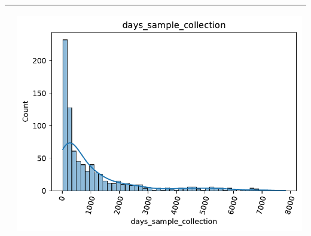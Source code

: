\begin{table}[!htb]
\begin{threeparttable}
\begin{tabular}{p{8cm} p{7cm}}
			& \begin{center}\includegraphics[width=1\linewidth]{NOTEBOOK/IMAGENES_DESCRIPTIVAS/7_days_sample_collection}\end{center}
			\\ \hline
		\end{tabular}
	\end{threeparttable}
\end{table}










